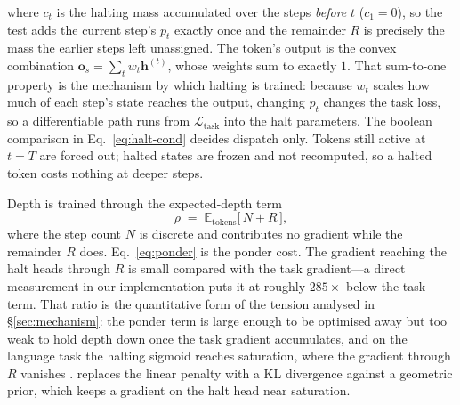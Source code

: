 where $c_t$ is the halting mass accumulated over the steps \emph{before} $t$
($c_1 = 0$), so the test adds the current step's $p_t$ exactly once and the
remainder $R$ is precisely the mass the earlier steps left unassigned. The token's
output is the convex combination
$\mathbf{o}_s = \sum_t w_t \mathbf{h}^{(t)}$, whose weights sum to exactly $1$.
That sum-to-one property is the mechanism by which halting is trained: because
$w_t$ scales how much of each step's state reaches the output, changing $p_t$
changes the task loss, so a differentiable path runs from $\mathcal{L}_{\text{task}}$
into the halt parameters. The boolean comparison in
Eq.~\ref{eq:halt-cond} decides dispatch only. Tokens still active at $t=T$ are
forced out; halted states are frozen and not recomputed, so a halted token costs
nothing at deeper steps.

Depth is trained through the expected-depth term
{\dispsize
\begin{equation}
\rho \;=\; \mathbb{E}_{\text{tokens}}\big[\,N + R\,\big],
\label{eq:ponder}
\end{equation}
}
where the step count $N$ is discrete and contributes no gradient while the
remainder $R$ does. Eq.~\ref{eq:ponder} is the ponder cost. The gradient reaching
the halt heads through $R$ is small compared with the task gradient---a direct
measurement in our implementation puts it at roughly $285\times$ below the task
term. That ratio is the quantitative form of the tension analysed in
\S\ref{sec:mechanism}: the ponder term is large enough to be optimised away but
too weak to hold depth down once the task gradient accumulates, and on the
language task the halting sigmoid reaches saturation, where the gradient through
$R$ vanishes \citep{graves2016act}.
\citet{banino2021pondernet} replaces the linear penalty with a KL divergence
against a geometric prior, which keeps a gradient on the halt head near
saturation.


